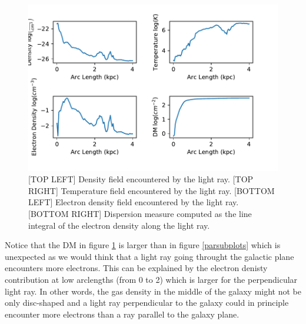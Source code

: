 \documentclass{article}
\begin{document}
\begin{figure}[h]
\begin{center}
\includegraphics[width = 0.7\columnwidth]{ray_perp_subplots.pdf}
\caption{[TOP LEFT] Density field encountered by the light ray. [TOP RIGHT] Temperature field encountered by the light ray. [BOTTOM LEFT] Electron density field encountered by the light ray. [BOTTOM RIGHT] Dispersion measure computed as the line integral of the electron density along the light ray.}
\label{perpsubplots}
\end{center}
\end{figure}

Notice that the DM in figure \ref{perpsubplots} is larger than in figure \ref{parsubplots} which is unexpected as we would think that a light ray going throught the galactic plane encounters more electrons. This can be explained by the electron denisty contribution at low arclengths (from 0 to 2) which is larger for the perpendicular light ray. In other words, the gas density in the middle of the galaxy might not be only disc-shaped and a light ray perpendicular to the galaxy could in principle encounter more electrons than a ray parallel to the galaxy plane.
\end{document}
